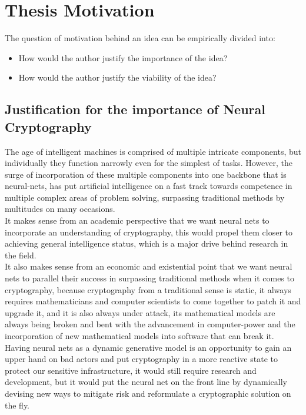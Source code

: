 \documentclass[a4paper, 12pt]{report}
\begin{document}
\section{\textbf{Thesis Motivation}}
The question of motivation behind an idea can be empirically divided into:
\begin{itemize}[nosep]
	\item How would the author justify the importance of the idea?
	\item How would the author justify the viability of the idea?
\end{itemize}
\subsection{\textbf{Justification for the importance of Neural Cryptography}}
The age of intelligent machines is comprised of multiple intricate components, but individually they function narrowly even for the simplest of tasks. However, the surge of incorporation of these multiple components into one backbone that is neural-nets, has put artificial intelligence on a fast track towards competence in multiple complex areas of problem solving, surpassing traditional methods by multitudes on many occasions.\\
It makes sense from an academic perspective that we want neural nets to incorporate an understanding of cryptography, this would propel them closer to achieving general intelligence status, which is a major drive behind research in the field.\\
It also makes sense from an economic and existential point that we want neural nets to parallel their success in surpassing traditional methods when it comes to cryptography, because cryptography from a traditional sense is static, it always requires mathematicians and computer scientists to come together to patch it and upgrade it, and it is also always under attack, its mathematical models are always being broken and bent with the advancement in computer-power and the incorporation of new mathematical models into software that can break it.
Having neural nets as a dynamic generative model is an opportunity to gain an upper hand on bad actors and put cryptography in a more reactive state to protect our sensitive infrastructure, it would still require research and development, but it would put the neural net on the front line by dynamically devising new ways to mitigate risk and reformulate a cryptographic solution on the fly.
\end{document}
